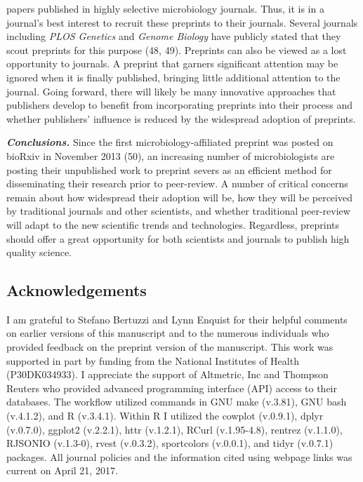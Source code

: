 \documentclass[11pt,]{article}
\begin{document}
papers published in highly selective microbiology journals. Thus, it is
in a journal's best interest to recruit these preprints to their
journals. Several journals including \emph{PLOS Genetics} and
\emph{Genome Biology} have publicly stated that they scout preprints for
this purpose (48, 49). Preprints can also be viewed as a lost
opportunity to journals. A preprint that garners significant attention
may be ignored when it is finally published, bringing little additional
attention to the journal. Going forward, there will likely be many
innovative approaches that publishers develop to benefit from
incorporating preprints into their process and whether publishers'
influence is reduced by the widespread adoption of preprints.

\textbf{\emph{Conclusions.}} Since the first microbiology-affiliated
preprint was posted on bioRxiv in November 2013 (50), an increasing
number of microbiologists are posting their unpublished work to preprint
severs as an efficient method for disseminating their research prior to
peer-review. A number of critical concerns remain about how widespread
their adoption will be, how they will be perceived by traditional
journals and other scientists, and whether traditional peer-review will
adapt to the new scientific trends and technologies. Regardless,
preprints should offer a great opportunity for both scientists and
journals to publish high quality science.

\subsection{Acknowledgements}\label{acknowledgements}

I am grateful to Stefano Bertuzzi and Lynn Enquist for their helpful
comments on earlier versions of this manuscript and to the numerous
individuals who provided feedback on the preprint version of the
manuscript. This work was supported in part by funding from the National
Institutes of Health (P30DK034933). I appreciate the support of
Altmetric, Inc and Thompson Reuters who provided advanced programming
interface (API) access to their databases. The workflow utilized
commands in GNU make (v.3.81), GNU bash (v.4.1.2), and R (v.3.4.1).
Within R I utilized the cowplot (v.0.9.1), dplyr (v.0.7.0), ggplot2
(v.2.2.1), httr (v.1.2.1), RCurl (v.1.95-4.8), rentrez (v.1.1.0),
RJSONIO (v.1.3-0), rvest (v.0.3.2), sportcolors (v.0.0.1), and tidyr
(v.0.7.1) packages. All journal policies and the information cited using
webpage links was current on April 21, 2017.
\end{document}
